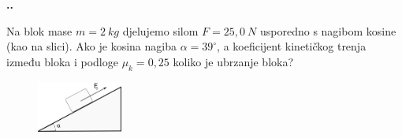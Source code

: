 

\noindent 
\textbf{
\thecjelina.\thezadatak.}

Na blok mase $m = 2\ kg$ djelujemo silom $F = 25,0\ N$
usporedno s nagibom kosine (kao na slici). Ako je kosina
nagiba $\alpha = 39^\circ$, a koeficijent kineti\v{c}kog trenja između
bloka i podloge $\mu_k = 0,25$ koliko je ubrzanje bloka?
\begin{figure}[ht]%
  \begin{center}
    \includegraphics[width=0.25\textwidth]{../03_Dinamika_materijalne_tocke/Zadatak_D605.png}
  \end{center}
\end{figure}

